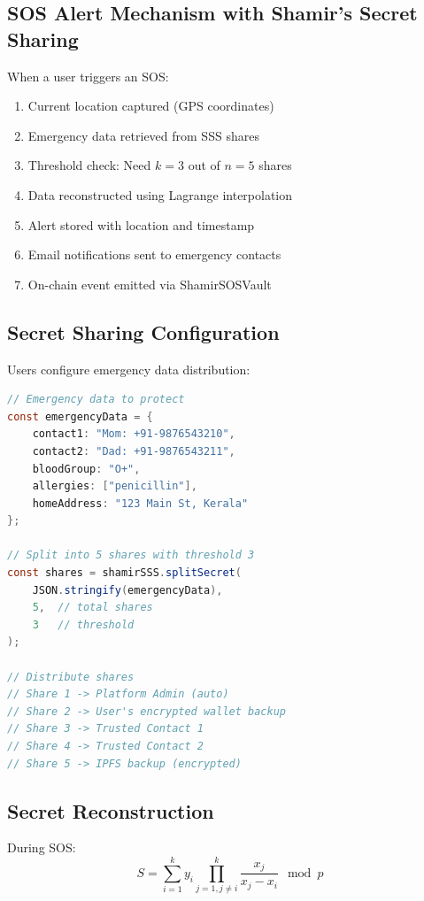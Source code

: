 \subsection{SOS Alert Mechanism with Shamir's Secret Sharing}

When a user triggers an SOS:

\begin{enumerate}
    \item Current location captured (GPS coordinates)
    \item Emergency data retrieved from SSS shares
    \item Threshold check: Need $k=3$ out of $n=5$ shares
    \item Data reconstructed using Lagrange interpolation
    \item Alert stored with location and timestamp
    \item Email notifications sent to emergency contacts
    \item On-chain event emitted via ShamirSOSVault
\end{enumerate}

\subsection{Secret Sharing Configuration}

Users configure emergency data distribution:

\begin{lstlisting}[language=Java, caption=Shamir's Secret Sharing Setup]
// Emergency data to protect
const emergencyData = {
    contact1: "Mom: +91-9876543210",
    contact2: "Dad: +91-9876543211",
    bloodGroup: "O+",
    allergies: ["penicillin"],
    homeAddress: "123 Main St, Kerala"
};

// Split into 5 shares with threshold 3
const shares = shamirSSS.splitSecret(
    JSON.stringify(emergencyData),
    5,  // total shares
    3   // threshold
);

// Distribute shares
// Share 1 -> Platform Admin (auto)
// Share 2 -> User's encrypted wallet backup
// Share 3 -> Trusted Contact 1
// Share 4 -> Trusted Contact 2
// Share 5 -> IPFS backup (encrypted)
\end{lstlisting}

\subsection{Secret Reconstruction}

During SOS:
\begin{equation}
S = \sum_{i=1}^{k} y_i \prod_{j=1, j \neq i}^{k} \frac{x_j}{x_j - x_i} \mod p
\end{equation}

